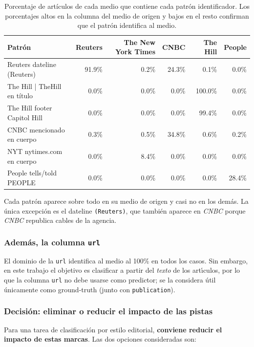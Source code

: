 \documentclass[11pt,a4paper]{article}
\begin{document}
\begin{table}[H]
\centering\small
\caption{Porcentaje de art\'iculos de cada medio que contiene cada patr\'on identificador. Los porcentajes altos en la columna del medio de origen y bajos en el resto confirman que el patr\'on identifica al medio.}
\label{tab:cross}
\begin{tabularx}{\textwidth}{X r r r r r}
\toprule
\textbf{Patr\'on} & \textbf{Reuters} & \textbf{The New York Times} & \textbf{CNBC} & \textbf{The Hill} & \textbf{People} \\
\midrule
Reuters dateline (Reuters) & 91.9\% & 0.2\% & 24.3\% & 0.1\% & 0.0\% \\
The Hill | TheHill en título & 0.0\% & 0.0\% & 0.0\% & 100.0\% & 0.0\% \\
The Hill footer Capitol Hill & 0.0\% & 0.0\% & 0.0\% & 99.4\% & 0.0\% \\
CNBC mencionado en cuerpo & 0.3\% & 0.5\% & 34.8\% & 0.6\% & 0.2\% \\
NYT nytimes.com en cuerpo & 0.0\% & 8.4\% & 0.0\% & 0.0\% & 0.0\% \\
People tells/told PEOPLE & 0.0\% & 0.0\% & 0.0\% & 0.0\% & 28.4\% \\
\bottomrule
\end{tabularx}
\end{table}

Cada patr\'{o}n aparece sobre todo en su medio de origen y casi no en los dem\'{a}s. La \'{u}nica excepci\'{o}n es el dateline \texttt{(Reuters)}, que tambi\'{e}n aparece en \textit{CNBC} porque \textit{CNBC} republica cables de la agencia.

\subsubsection*{Adem\'{a}s, la columna \texttt{url}}

El dominio de la \texttt{url} identifica al medio al 100\% en todos los casos. Sin embargo, en este trabajo el objetivo es clasificar a partir del \emph{texto} de los art\'{\i}culos, por lo que la columna \texttt{url} no debe usarse como predictor; se la considera \'{u}til \'{u}nicamente como ground-truth (junto con \texttt{publication}).

\subsubsection*{Decisi\'{o}n: eliminar o reducir el impacto de las pistas}

Para una tarea de clasificaci\'{o}n por estilo editorial, \textbf{conviene reducir el impacto de estas marcas}. Las dos opciones consideradas son:
\end{document}
